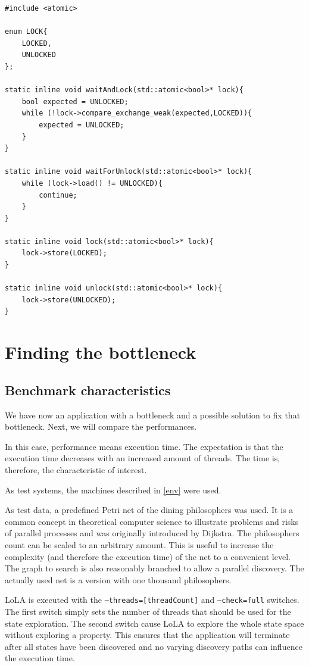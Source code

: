 \begin{lstlisting}
#include <atomic>

enum LOCK{
    LOCKED,
    UNLOCKED
};

static inline void waitAndLock(std::atomic<bool>* lock){
    bool expected = UNLOCKED;
    while (!lock->compare_exchange_weak(expected,LOCKED)){
        expected = UNLOCKED;
    }
}

static inline void waitForUnlock(std::atomic<bool>* lock){
    while (lock->load() != UNLOCKED){
        continue;
    }
}

static inline void lock(std::atomic<bool>* lock){
    lock->store(LOCKED);
}

static inline void unlock(std::atomic<bool>* lock){
    lock->store(UNLOCKED);
}
\end{lstlisting}

\section{Finding the bottleneck}
\subsection{Benchmark characteristics}
We have now an application with a bottleneck and a possible solution to fix that bottleneck. Next, we will compare the performances.

In this case, performance means execution time. The expectation is that the execution time decreases with an increased amount of threads. The time is, therefore, the characteristic of interest.

As test systems, the machines described in \ref{env} were used.

As test data, a predefined Petri net of the dining philosophers was used. It is a common concept in theoretical computer science to illustrate problems and risks of parallel processes and was originally introduced by Dijkstra\cite{dijkstra1971hierarchical}. The philosophers count can be scaled to an arbitrary amount. This is useful to increase the complexity (and therefore the execution time) of the net to a convenient level. The graph to search is also reasonably branched to allow a parallel discovery. The actually used net is a version with one thousand philosophers.

LoLA is executed with the \texttt{--threads=[threadCount]} and \texttt{--check=full} switches. The first switch simply sets the number of threads that should be used for the state exploration. The second switch cause LoLA to explore the whole state space without exploring a property. This ensures that the application will terminate after all states have been discovered and no varying discovery paths can influence the execution time.

